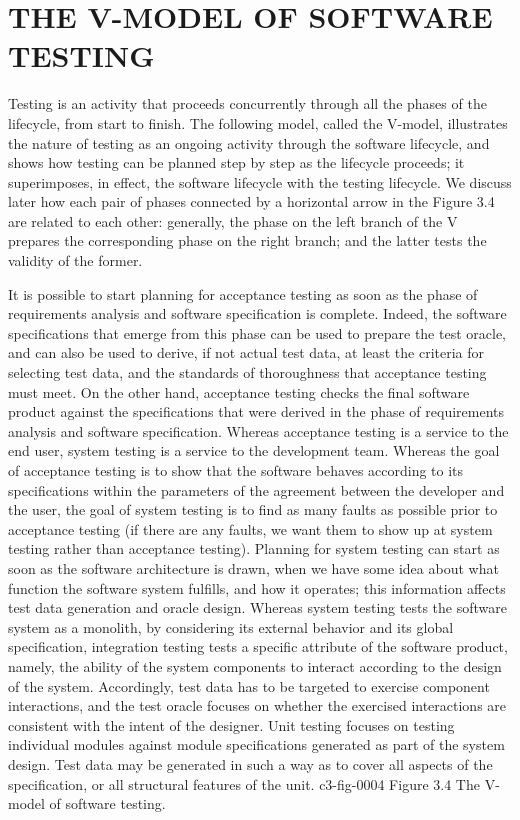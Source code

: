 \section{THE V-MODEL OF SOFTWARE TESTING} 

Testing is an activity that proceeds concurrently through all the phases of the lifecycle, from start to finish. The following model, called the V-model, illustrates the nature of testing as an ongoing activity through the software lifecycle, and shows how testing can be planned step by step as the lifecycle proceeds; it superimposes, in effect, the software lifecycle with the testing lifecycle. We discuss later how each pair of phases connected by a horizontal arrow in the Figure 3.4 are related to each other: generally, the phase on the left branch of the V prepares the corresponding phase on the right branch; and the latter tests the validity of the former.

It is possible to start planning for acceptance testing as soon as the phase of requirements analysis and software specification is complete. Indeed, the software specifications that emerge from this phase can be used to prepare the test oracle, and can also be used to derive, if not actual test data, at least the criteria for selecting test data, and the standards of thoroughness that acceptance testing must meet. On the other hand, acceptance testing checks the final software product against the specifications that were derived in the phase of requirements analysis and software specification.
Whereas acceptance testing is a service to the end user, system testing is a service to the development team. Whereas the goal of acceptance testing is to show that the software behaves according to its specifications within the parameters of the agreement between the developer and the user, the goal of system testing is to find as many faults as possible prior to acceptance testing (if there are any faults, we want them to show up at system testing rather than acceptance testing). Planning for system testing can start as soon as the software architecture is drawn, when we have some idea about what function the software system fulfills, and how it operates; this information affects test data generation and oracle design.
Whereas system testing tests the software system as a monolith, by considering its external behavior and its global specification, integration testing tests a specific attribute of the software product, namely, the ability of the system components to interact according to the design of the system. Accordingly, test data has to be targeted to exercise component interactions, and the test oracle focuses on whether the exercised interactions are consistent with the intent of the designer.
Unit testing focuses on testing individual modules against module specifications generated as part of the system design. Test data may be generated in such a way as to cover all aspects of the specification, or all structural features of the unit.
c3-fig-0004
Figure 3.4 The V-model of software testing.